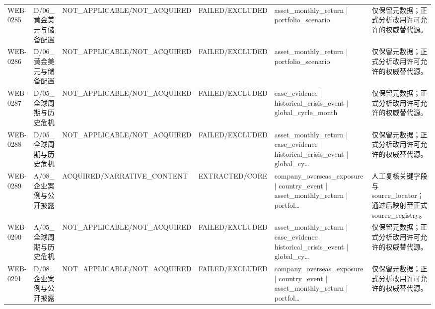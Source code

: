 \begin{landscape}
\begin{longtable}{p{1.8cm}p{2.6cm}p{2.6cm}p{2.6cm}p{4.8cm}p{7.2cm}}
WEB-0285 & D/\allowbreak{}06\_\allowbreak{}黄金美元与储备配置 & NOT\_\allowbreak{}APPLICABLE/\allowbreak{}NOT\_\allowbreak{}ACQUIRED & FAILED/\allowbreak{}EXCLUDED & asset\_\allowbreak{}monthly\_\allowbreak{}return | portfolio\_\allowbreak{}scenario & 仅保留元数据；正式分析改用许可允许的权威替代源。\\
WEB-0286 & D/\allowbreak{}06\_\allowbreak{}黄金美元与储备配置 & NOT\_\allowbreak{}APPLICABLE/\allowbreak{}NOT\_\allowbreak{}ACQUIRED & FAILED/\allowbreak{}EXCLUDED & asset\_\allowbreak{}monthly\_\allowbreak{}return | portfolio\_\allowbreak{}scenario & 仅保留元数据；正式分析改用许可允许的权威替代源。\\
WEB-0287 & D/\allowbreak{}05\_\allowbreak{}全球周期与历史危机 & NOT\_\allowbreak{}APPLICABLE/\allowbreak{}NOT\_\allowbreak{}ACQUIRED & FAILED/\allowbreak{}EXCLUDED & case\_\allowbreak{}evidence | historical\_\allowbreak{}crisis\_\allowbreak{}event | global\_\allowbreak{}cycle\_\allowbreak{}month & 仅保留元数据；正式分析改用许可允许的权威替代源。\\
WEB-0288 & D/\allowbreak{}05\_\allowbreak{}全球周期与历史危机 & NOT\_\allowbreak{}APPLICABLE/\allowbreak{}NOT\_\allowbreak{}ACQUIRED & FAILED/\allowbreak{}EXCLUDED & asset\_\allowbreak{}monthly\_\allowbreak{}return | case\_\allowbreak{}evidence | historical\_\allowbreak{}crisis\_\allowbreak{}event | global\_\allowbreak{}cy… & 仅保留元数据；正式分析改用许可允许的权威替代源。\\
WEB-0289 & A/\allowbreak{}08\_\allowbreak{}企业案例与公开披露 & ACQUIRED/\allowbreak{}NARRATIVE\_\allowbreak{}CONTENT & EXTRACTED/\allowbreak{}CORE & company\_\allowbreak{}overseas\_\allowbreak{}exposure | country\_\allowbreak{}event | asset\_\allowbreak{}monthly\_\allowbreak{}return | portfol… & 人工复核关键字段与source\_\allowbreak{}locator；通过后映射至正式source\_\allowbreak{}registry。\\
WEB-0290 & A/\allowbreak{}05\_\allowbreak{}全球周期与历史危机 & NOT\_\allowbreak{}APPLICABLE/\allowbreak{}NOT\_\allowbreak{}ACQUIRED & FAILED/\allowbreak{}EXCLUDED & asset\_\allowbreak{}monthly\_\allowbreak{}return | case\_\allowbreak{}evidence | historical\_\allowbreak{}crisis\_\allowbreak{}event | global\_\allowbreak{}cy… & 仅保留元数据；正式分析改用许可允许的权威替代源。\\
WEB-0291 & D/\allowbreak{}08\_\allowbreak{}企业案例与公开披露 & NOT\_\allowbreak{}APPLICABLE/\allowbreak{}NOT\_\allowbreak{}ACQUIRED & FAILED/\allowbreak{}EXCLUDED & company\_\allowbreak{}overseas\_\allowbreak{}exposure | country\_\allowbreak{}event | asset\_\allowbreak{}monthly\_\allowbreak{}return | portfol… & 仅保留元数据；正式分析改用许可允许的权威替代源。\\

\end{longtable}
\end{landscape}

